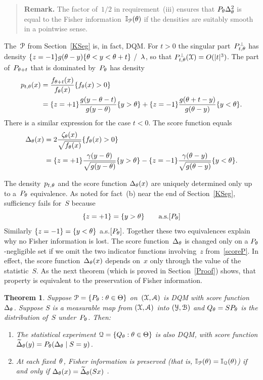 \documentclass[aos]{imsart}
\theoremstyle{plain}
\newtheorem{theorem}[equation]{Theorem}
\theoremstyle{remark}
\newenvironment{remark}{\begin{quote}{\bf Remark.\quad}\rm\small}{\end{quote}}
\def\Theorem{\begin{theorem}}
\def\endTheorem{\end{theorem}}
\def\Remark{\begin{remark}}
\def\endRemark{\end{remark}}
\begin{document}
\Remark 
The factor of~$1/2$ in requirement~(iii) ensures that $P_\theta \Delta_\theta^2$ is equal to the Fisher information~${\mathbb I}_{\EuScript P}(\theta)$ if the densities are suitably smooth in a pointwise sense. 
\endRemark

The~${\EuScript P}$ from Section~\ref{KSeg} is, in fact, DQM. For $t>0$ the
singular part~$P^\bot_{t,\theta}$ has density
$\{z=-1\}g(\theta-y)\{\theta<y<\theta+t\}$ \wrt/~$\lambda$, so that
$P^\bot_{t,\theta}({\EuScript X})=O(|t|^3)$. The part of~$P_{\theta+t}$ that is
dominated by~$P_\theta$ has density
\begin{align}
p_{t,\theta}(x) &= \frac{f_{\theta+t}(x)}{f_\theta(x)}\{f_\theta(x)>0\}
\notag
\\
&= \{z = +1\}\frac{g(y-\theta-t)}{g(y-\theta)} \{y>\theta\}
+ \{z = -1\}\frac{g(\theta+t-y)}{g(\theta-y)} \{y <\theta\} .
\label{ptth}
\end{align}
There is a similar expression for the case $t<0$.
The score function equals
\begin{align}
\Delta_\theta(x) 
&= 2\frac{\zeta_\theta(x)}{\sqrt{f_\theta(x)}} \{f_\theta(x)>0\}
\notag\\
&= \{z= +1\}\frac{\gamma(y-\theta)}{\sqrt{g(y-\theta)}}\{y>\theta\}
- \{z= -1\}\frac{\gamma(\theta-y)}{\sqrt{g(\theta-y)}}\{y<\theta\} .
\label{scoreP}
\end{align}

The density~$p_{t,\theta}$ and the score function $\Delta_\theta(x)$ are
uniquely determined only up to a~$P_\theta$ equivalence. As noted for fact~(b)
near the end of Section~\ref{KSeg},  sufficiency fails for~$S$ because
\begin{equation*}
\{z=+1\}=\{y>\theta\}
\qquad\hbox{\rm a.s.$[P_\theta]$}
\end{equation*}
Similarly $\{z=-1\} =\{y<\theta\}$ a.s.$[P_\theta]$. Together these two equivalences  explain why no Fisher information is lost. The score function~$\Delta_\theta$ is
changed only on a $P_\theta$-negligible set if we omit the two indicator
functions involving~$z$ from~\cref{scoreP}. In effect, the score
function~$\Delta_\theta(x)$ depends on~$x$ only through the value of the
statistic~$S$. As the next theorem (which is proved in Section~\ref{Proof})
shows, that property is equivalent to the preservation of  Fisher information.


\Theorem  \label{preserveDQM}
Suppose ${\EuScript P}=\{P_\theta:\theta\in\Theta\}$ on~$({\EuScript X},{\EuScript A})$
is DQM  with score function~$\Delta_\theta$.
Suppose $S$ is a measurable map from $({\EuScript X},{\EuScript A})$ into $({\EuScript Y},{\EuScript B})$
and $Q_\theta = SP_\theta$ is the distribution of~$S$ under~$P_\theta$.
Then: 
\begin{enumerate} 
\item
The statistical experiment
${\EuScript Q}=\{Q_\theta:\theta\in\Theta\}$ is also DQM, with score function 
$\widetilde\Delta_\theta(y) = P_\theta(\Delta_\theta\mid S=y)$.  

\item
At each fixed~$\theta$, Fisher information is preserved (that is, ${\mathbb I}_{\EuScript P}(\theta)={\mathbb I}_{\EuScript Q}(\theta)$) if and only if $\Delta_\theta(x) = \widetilde\Delta_\theta(Sx)$ .

\end{enumerate} 
\endTheorem
\end{document}
